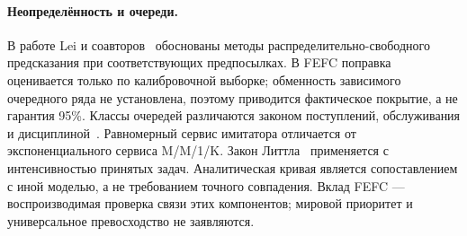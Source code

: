 \paragraph{Неопределённость и очереди.}
В работе Lei и соавторов~\cite{lei} обоснованы методы распределительно-свободного предсказания при соответствующих предпосылках. В FEFC поправка оценивается только по калибровочной выборке; обменность зависимого очередного ряда не установлена, поэтому приводится фактическое покрытие, а не гарантия 95\%. Классы очередей различаются законом поступлений, обслуживания и дисциплиной~\cite{kendall}. Равномерный сервис имитатора отличается от экспоненциального сервиса M/M/1/K. Закон Литтла~\cite{little} применяется с интенсивностью принятых задач. Аналитическая кривая является сопоставлением с иной моделью, а не требованием точного совпадения. Вклад FEFC --- воспроизводимая проверка связи этих компонентов; мировой приоритет и универсальное превосходство не заявляются.
